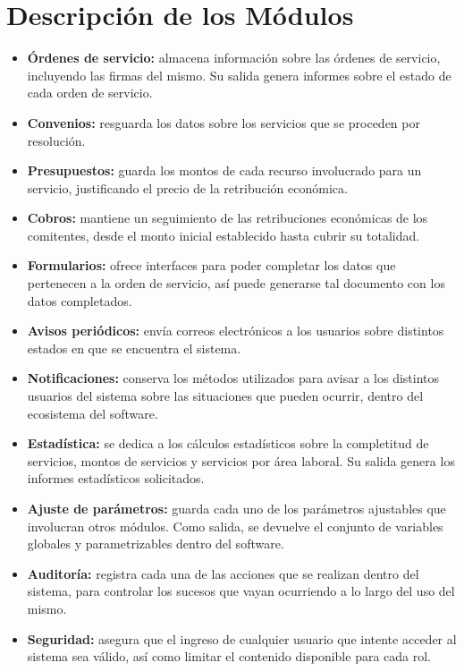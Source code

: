 \section{Descripci\'on de los M\'odulos}
\begin{itemize}
	\item \textbf{\'Ordenes de servicio:}
	almacena informaci\'on sobre las \'ordenes
	de servicio, incluyendo las firmas del mismo.
	Su salida genera informes sobre el estado de
	cada orden de servicio.
	\item \textbf{Convenios:} resguarda los datos
	sobre los servicios que se proceden por
	resoluci\'on.
	\item \textbf{Presupuestos:} guarda los
	montos de cada recurso involucrado para un
	servicio, justificando el precio de la
	retribuci\'on econ\'omica.
	\item \textbf{Cobros:} mantiene un seguimiento
	de las retribuciones econ\'omicas de los
	comitentes, desde el monto inicial establecido
	hasta cubrir su totalidad.
	\item \textbf{Formularios:} ofrece interfaces
	para poder completar los datos que pertenecen
	a la orden de servicio, as\'i puede generarse
	tal documento con los datos completados.
	\item \textbf{Avisos peri\'odicos:} env\'ia
	correos electr\'onicos a los usuarios sobre
	distintos estados en que se encuentra el
	sistema.
	\item \textbf{Notificaciones:} conserva los
	m\'etodos utilizados para avisar a los
	distintos usuarios del sistema sobre las
	situaciones que pueden ocurrir, dentro del
	ecosistema del software.
	\item \textbf{Estad\'istica:} se dedica a los
	c\'alculos estad\'isticos sobre la completitud
	de servicios, montos de servicios y servicios
	por \'area laboral. Su salida genera los
	informes estad\'isticos solicitados.
	\item \textbf{Ajuste de par\'ametros:} guarda
	cada uno de los par\'ametros ajustables que
	involucran otros m\'odulos. Como salida, se
	devuelve el conjunto de variables globales y
	parametrizables dentro del software.
	\item \textbf{Auditor\'ia:} registra cada una
	de las acciones que se realizan dentro del
	sistema, para controlar los sucesos que vayan
	ocurriendo a lo largo del uso del mismo.
	\item \textbf{Seguridad:} asegura que el
	ingreso de cualquier usuario que intente
	acceder al sistema sea v\'alido, as\'i como
	limitar el contenido disponible para cada rol.
\end{itemize}
\newpage
